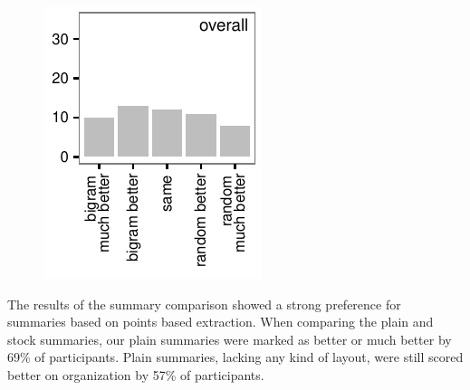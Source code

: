 \begin{figure}
\begin{minipage}{.5\textwidth}
		  \label{fig:bigram_vs_random_hist}
		\end{minipage}%
		\begin{minipage}{.25\textwidth}
		  \centering
		  \includegraphics[width=\textwidth]{graphs/bigram_vs_random_hists}
		  \label{fig:bigram_vs_random_hist}
		\end{minipage}%
	  \end{figure}

      The results of the summary comparison showed a strong preference for summaries based on points based extraction. When comparing the plain and stock summaries, our plain summaries were marked as better or much better by 69\% of participants. Plain summaries, lacking any kind of layout, were still scored better on organization by 57\% of participants.

